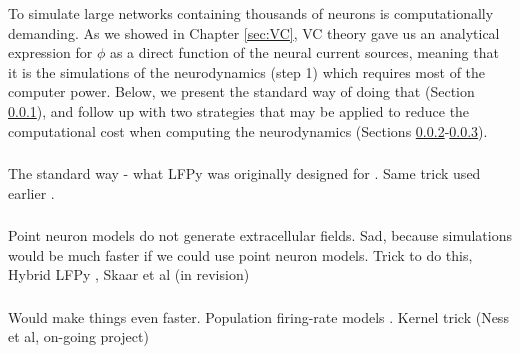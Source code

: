 To simulate large networks containing thousands of neurons is computationally demanding. As we showed in Chapter \ref{sec:VC}, VC theory gave us an analytical expression for $\phi$ as a direct function of the neural current sources, meaning that it is the simulations of the neurodynamics (step 1) which requires most of the computer power. Below, we present the standard way of doing that (Section \ref{sec:Schemes:LFPy}), and follow up with two strategies that may be applied to reduce the computational cost when computing the neurodynamics (Sections \ref{sec:Schemes:HybridLFPy}-\ref{sec:Schemes:KernelLFPy}).


\subsubsection{}
\label{sec:Schemes:LFPy}
The standard way - what LFPy was originally designed for \citep{Hagen2018}.
Same trick used earlier \citep{Holt1999}.


\subsubsection{}
\label{sec:Schemes:HybridLFPy}
Point neuron models do not generate extracellular fields. Sad, because simulations would be much faster if we could use point neuron models. Trick to do this, Hybrid LFPy \citep{Hagen2016}, Skaar et al (in revision)


\subsubsection{}
\label{sec:Schemes:KernelLFPy}
Would make things even faster. Population firing-rate models  \citep{Hagen2016}. Kernel trick (Ness et al, on-going project) 





